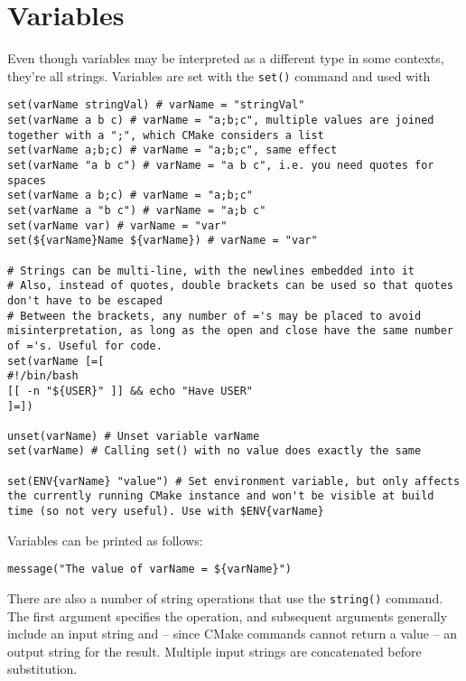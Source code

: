 \documentclass[8pt, table, xcdraw]{article}%
\begin{document}
\section{Variables}

Even though variables may be interpreted as a different type in some contexts, they're all strings. Variables are set with the \lstinline{set()} command and used with %

\begin{lstlisting}
set(varName stringVal) # varName = "stringVal"
set(varName a b c) # varName = "a;b;c", multiple values are joined together with a ";", which CMake considers a list
set(varName a;b;c) # varName = "a;b;c", same effect
set(varName "a b c") # varName = "a b c", i.e. you need quotes for spaces
set(varName a b;c) # varName = "a;b;c"
set(varName a "b c") # varName = "a;b c"
set(varName var) # varName = "var"
set(${varName}Name ${varName}) # varName = "var"

# Strings can be multi-line, with the newlines embedded into it
# Also, instead of quotes, double brackets can be used so that quotes don't have to be escaped
# Between the brackets, any number of ='s may be placed to avoid misinterpretation, as long as the open and close have the same number of ='s. Useful for code.
set(varName [=[
#!/bin/bash
[[ -n "${USER}" ]] && echo "Have USER"
]=])

unset(varName) # Unset variable varName
set(varName) # Calling set() with no value does exactly the same

set(ENV{varName} "value") # Set environment variable, but only affects the currently running CMake instance and won't be visible at build time (so not very useful). Use with $ENV{varName}
\end{lstlisting}

Variables can be printed as follows:

\begin{lstlisting}
message("The value of varName = ${varName}")
\end{lstlisting}

There are also a number of string operations that use the \lstinline{string()} command. The first argument specifies the operation, and subsequent arguments generally include an input string and -- since CMake commands cannot return a value -- an output string for the result. Multiple input strings are concatenated before substitution.
\end{document}
